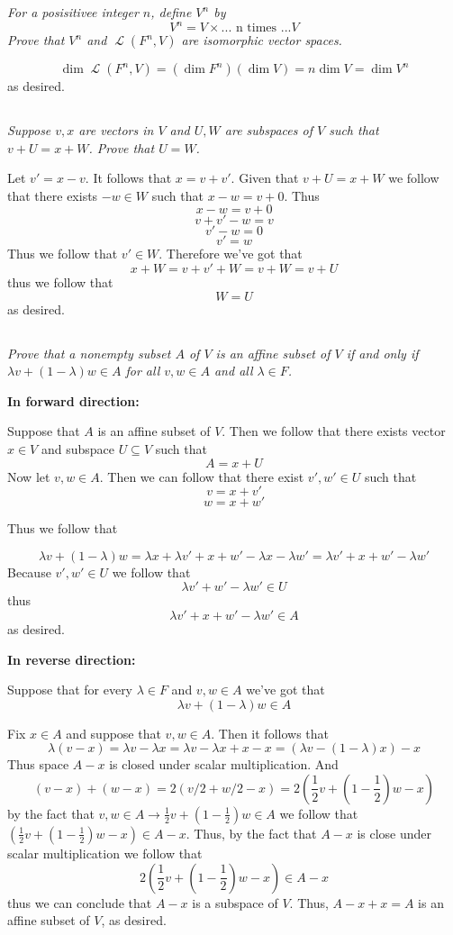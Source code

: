 \documentclass[11pt,oneside,titlepage]{book}
\DeclareMathOperator \map {\mathcal {L}}
\begin{document}
\textit{For a posisitivee integer $n$, define $V^n$ by}
$$V^n = V \times ...\text{ n times }... V$$
\textit{Prove that $V^n$ and $\map(F^n, V)$ are isomorphic vector spaces.}

$$\dim \map(F^n, V) = (\dim F^n) ( \dim V) =  n \dim V = \dim V^n$$
as desired.

\subsection{}

\textit{Suppose $v, x$ are vectors in $V$ and $U, W$ are subspaces of $V$ such that
  $v + U = x + W$. Prove that $U = W$.}

Let $v'= x - v$. It follows that $x = v + v'$. Given that $v + U = x + W$ we follow
that there exists $-w \in W$ such that $x - w = v + 0$. Thus
$$x - w = v + 0$$
$$v + v' - w = v$$
$$v' - w = 0$$
$$v' = w$$
Thus we follow that $v' \in W$. Therefore we've got that
$$x + W = v + v' + W = v + W = v + U$$
thus we follow that
$$W = U$$
as desired.

\subsection{}

\textit{Prove that a nonempty subset $A$ of $V$ is an affine subset of $V$ if and only if
  $\lambda v + (1 - \lambda)w \in A$ for all $v, w \in A$ and all $\lambda \in F$.}

\textbf{In forward direction: }

Suppose that $A$ is an affine subset of $V$. Then we follow that there exists vector
$x \in V$ and subspace $U \subseteq V$ such that
$$A = x + U$$
Now let $v, w \in A$. Then we can follow that there exist $v', w' \in U$ such
that
$$v = x + v'$$
$$w = x + w'$$

Thus we follow that

$$\lambda v + (1 - \lambda) w = \lambda x + \lambda v' + x + w' - \lambda x - \lambda w' =
\lambda v' + x + w' - \lambda w' $$
Because $v', w' \in U$ we follow that
$$\lambda v' + w' - \lambda w' \in U$$
thus
$$\lambda v' + x + w' - \lambda w' \in A$$
as desired.

\textbf{In reverse direction: }

Suppose that for every $\lambda \in F$ and $v, w \in A$ we've got that
$$\lambda v + (1 - \lambda) w \in A $$

Fix $x \in A$ and suppose that $v, w \in A$. Then it follows that
$$ \lambda(v  - x) = \lambda v  - \lambda x =
\lambda v  - \lambda x + x - x =
(\lambda v  - (1 - \lambda) x) - x
$$
Thus space $A - x$ is closed under scalar multiplication. And
$$ (v - x) + (w - x) = 2(v/2 + w/2 - x) = 2(\frac{1}{2} v + (1 - \frac 1 2) w - x) $$
by the fact that $v, w \in A \to \frac{1}{2} v + (1 - \frac 1 2) w \in A$ we follow that
$(\frac{1}{2} v + (1 - \frac 1 2) w - x) \in A - x$. Thus, by the fact that
$A - x$ is close under scalar multiplication we follow that
$$2(\frac{1}{2} v + (1 - \frac 1 2) w - x) \in A - x$$
thus we can conclude that $A - x$ is a subspace of $V$. Thus, $A - x + x = A$ is an affine
subset of $V$, as desired.
\end{document}
